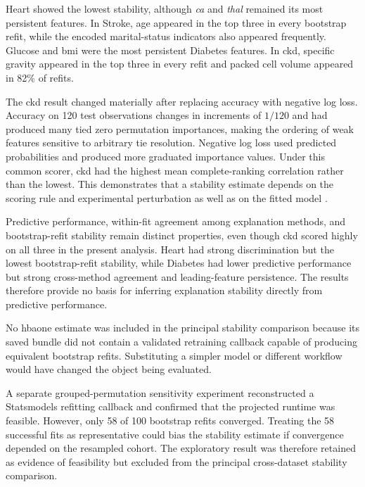 Heart showed the lowest stability, although \emph{ca} and \emph{thal} remained its most persistent features. In Stroke, age appeared in the top three in every bootstrap refit, while the encoded marital-status indicators also appeared frequently. Glucose and \gls{bmi} were the most persistent Diabetes features. In \gls{ckd}, specific gravity appeared in the top three in every refit and packed cell volume appeared in 82\% of refits.

The \gls{ckd} result changed materially after replacing accuracy with negative log loss. Accuracy on 120 test observations changes in increments of $1/120$ and had produced many tied zero permutation importances, making the ordering of weak features sensitive to arbitrary tie resolution. Negative log loss used predicted probabilities and produced more graduated importance values. Under this common scorer, \gls{ckd} had the highest mean complete-ranking correlation rather than the lowest. This demonstrates that a stability estimate depends on the scoring rule and experimental perturbation as well as on the fitted model \citep{fisher_models_2019, lofstrom_meta_2022, canha_functionally-grounded_2025}.

Predictive performance, within-fit agreement among explanation methods, and bootstrap-refit stability remain distinct properties, even though \gls{ckd} scored highly on all three in the present analysis. Heart had strong discrimination but the lowest bootstrap-refit stability, while Diabetes had lower predictive performance but strong cross-method agreement and leading-feature persistence. The results therefore provide no basis for inferring explanation stability directly from predictive performance.

No \gls{hbaone} estimate was included in the principal stability comparison because its saved bundle did not contain a validated retraining callback capable of producing equivalent bootstrap refits. Substituting a simpler model or different workflow would have changed the object being evaluated.

A separate grouped-permutation sensitivity experiment reconstructed a Statsmodels refitting callback and confirmed that the projected runtime was feasible. However, only 58 of 100 bootstrap refits converged. Treating the 58 successful fits as representative could bias the stability estimate if convergence depended on the resampled cohort. The exploratory result was therefore retained as evidence of feasibility but excluded from the principal cross-dataset stability comparison.

